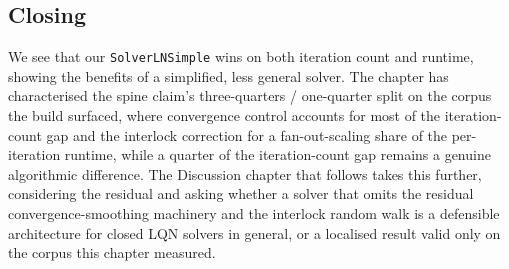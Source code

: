 \subsection{Closing}

We see that our \texttt{SolverLNSimple} wins on both iteration count and runtime, showing the benefits of a simplified, less general solver. The chapter has characterised the spine claim's three-quarters / one-quarter split on the corpus the build surfaced, where convergence control accounts for most of the iteration-count gap and the interlock correction for a fan-out-scaling share of the per-iteration runtime, while a quarter of the iteration-count gap remains a genuine algorithmic difference. The Discussion chapter that follows takes this further, considering the residual and asking whether a solver that omits the residual convergence-smoothing machinery and the interlock random walk is a defensible architecture for closed LQN solvers in general, or a localised result valid only on the corpus this chapter measured.



